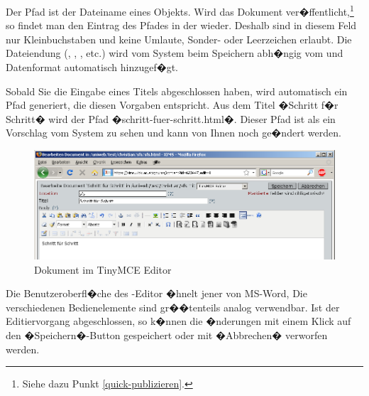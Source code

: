 Der Pfad 
ist der Dateiname eines Objekts. Wird das Dokument
ver�ffentlicht,\footnote{Siehe dazu Punkt \ref{quick-publizieren}.} so
findet man den Eintrag 
des Pfades
in der 
wieder. Deshalb sind in diesem Feld nur Kleinbuchstaben und keine
Umlaute, Sonder- oder Leerzeichen erlaubt. Die Dateiendung
(, , , etc.) wird vom System beim
Speichern abh�ngig vom  und Datenformat
automatisch hinzugef�gt.

Sobald Sie die Eingabe eines Titels abgeschlossen haben, wird automatisch 
ein Pfad 
generiert, die diesen Vorgaben entspricht. Aus dem Titel �Schritt f�r Schritt� wird 
der Pfad 
�schritt-fuer-schritt.html�. 
Dieser Pfad 
ist als ein Vorschlag vom System zu sehen und kann von Ihnen noch ge�ndert werden. 



\begin{figure}[!ht]
  \centering
  \includegraphics[width=1.00\textwidth]{./images/XI5S-dokument-tinymce.png}
  \caption{Dokument im TinyMCE Editor}
  \label{fig:XI5S-dokument-tinymce}
\end{figure}

Die Benutzeroberfl�che des -Editor �hnelt jener von
MS-Word, Die verschiedenen Bedienelemente sind gr��tenteils analog
verwendbar. Ist der Editiervorgang abgeschlossen, so k�nnen die
�nderungen mit einem Klick auf den �Speichern�-Button gespeichert
oder mit �Abbrechen� verworfen werden.

